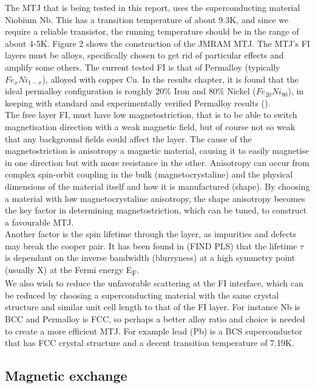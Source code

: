 \documentclass[12pt]{article}
\begin{document}
The MTJ that is being tested in this report, uses the superconducting material Niobium Nb. This has a transition temperature of about 9.3K, and since we require a reliable transistor, the running temperature should be in the range of about 4-5K. Figure 2 shows the construction of the JMRAM MTJ. The MTJ's FI layers must be alloys, specifically chosen to get rid of particular effects and amplify some others. The current tested FI is that of Permalloy (typically $Fe_{x}Ni_{1-x}$), alloyed with copper Cu. In the results chapter, it is found that the ideal permalloy configuration is roughly 20\% Iron and 80\% Nickel ($Fe_{20}Ni_{80}$), in keeping with standard and experimentally verified Permalloy results (\cite{permprob}).
\\
The free layer FI, must have low magnetostriction, that is to be able to switch magnetisation direction with a weak magnetic field, but of course not so weak that any background fields could affect the layer. The cause of the magnetostriction is anisotropy a magnetic material, causing it to easily magnetise in one direction but with more resistance in the other. Anisotropy can occur from complex spin-orbit coupling in the bulk (magnetocrystaline) and the physical dimensions of the material itself and how it is manufactured (shape). By choosing a material with low magnetocrystaline anisotropy, the shape anisotropy becomes the key factor in determining magnetostriction, which can be tuned, to construct a favourable MTJ. 
\\
Another factor is the spin lifetime through the layer, as impurities and defects may break the cooper pair. It has been found in (FIND PLS) that the lifetime $\tau$ is dependant on the inverse bandwidth (blurryness) at a high symmetry point (usually X) at the Fermi energy E\textsubscript{F}.
\\
We also wish to reduce the unfavorable scattering at the FI interface, which can be reduced by choosing a superconducting material with the same crystal structure and similar unit cell length to that of the FI layer. For instance Nb is BCC \cite{ashcroft} and Permalloy is FCC, so perhaps a better alloy ratio and choice is needed to create a more efficient MTJ. For example lead (Pb) is a BCS superconductor that has FCC crystal structure\cite{ashcroft} and a decent transition temperature of 7.19K.

\subsection{Magnetic exchange}
\end{document}
